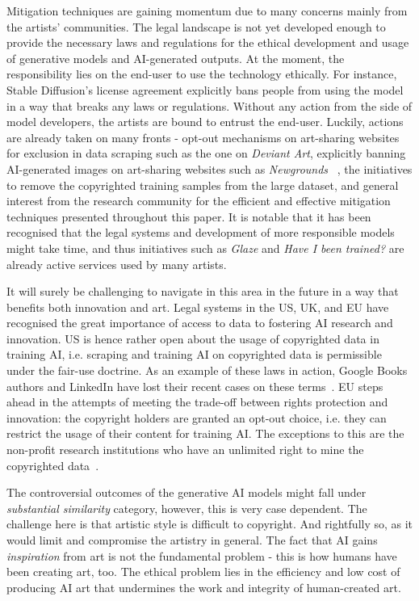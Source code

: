 Mitigation techniques are gaining momentum due to many concerns mainly from the artists' communities. The legal landscape is not yet developed enough to provide the necessary laws and regulations for the ethical development and usage of generative models and AI-generated outputs. 
At the moment, the responsibility lies on the end-user to use the technology ethically. For instance, Stable Diffusion's license agreement explicitly bans people from using the model in a way that breaks any laws or regulations. 
Without any action from the side of model developers, the artists are bound to entrust the end-user. 
Luckily, actions are already taken on many fronts - opt-out mechanisms on art-sharing websites for exclusion in data scraping such as the one on \textit{Deviant Art}, explicitly banning AI-generated images on art-sharing websites such as \textit{Newgrounds} ~\cite{noauthor_newgrounds_nodate}, the initiatives to remove the copyrighted training samples from the large dataset, and general interest from the research community for the efficient and effective mitigation techniques presented throughout this paper. 
It is notable that it has been recognised that the legal systems and development of more responsible models might take time, and thus initiatives such as \textit{Glaze} and \textit{Have I been trained?} are already active services used by many artists.

It will surely be challenging to navigate in this area in the future in a way that benefits both innovation and art. 
Legal systems in the US, UK, and EU have recognised the great importance of access to data to fostering AI research and innovation. 
US is hence rather open about the usage of copyrighted data in training AI, i.e. scraping and training AI on copyrighted data is permissible under the fair-use doctrine. 
As an example of these laws in action, Google Books authors and LinkedIn have lost their recent cases on these terms~\cite{noauthor_authors_2023,noauthor_web_nodate}.
EU steps ahead in the attempts of meeting the trade-off between rights protection and innovation: the copyright holders are granted an opt-out choice, i.e. they can restrict the usage of their content for training AI. 
The exceptions to this are the non-profit research institutions who have an unlimited right to mine the copyrighted data~\cite{noauthor_proposal_2016}. 

The controversial outcomes of the generative AI models might fall under \textit{substantial similarity} category, however, this is very case dependent. The challenge here is that artistic style is difficult to copyright. And rightfully so, as it would limit and compromise the artistry in general.
The fact that AI gains \textit{inspiration} from art is not the fundamental problem - this is how humans have been creating art, too. The ethical problem lies in the efficiency and low cost of producing AI art that undermines the work and integrity of human-created art. 

